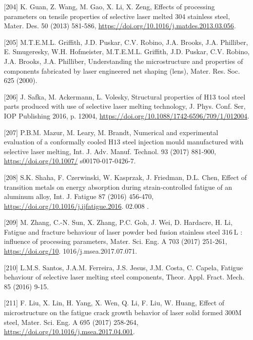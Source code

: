 \documentclass[10pt]{article}
\begin{document}
[204] K. Guan, Z. Wang, M. Gao, X. Li, X. Zeng, Effects of processing parameters on tensile properties of selective laser melted 304 stainless steel, Mater. Des. 50 (2013) 581-586, \href{https://doi.org/10.1016/j.matdes.2013.03.056}{https://doi.org/10.1016/j.matdes.2013.03.056}.

[205] M.T.E.M.L. Griffith, J.D. Puskar, C.V. Robino, J.A. Brooks, J.A. Philliber, E. Smugeresky, W.H. Hofmeister, M.T.E.M.L. Griffith, J.D. Puskar, C.V. Robino, J.A. Brooks, J.A. Philliber, Understanding the microstructure and properties of components fabricated by laser engineered net shaping (lens), Mater. Res. Soc. 625 (2000).

[206] J. Safka, M. Ackermann, L. Volesky, Structural properties of H13 tool steel parts produced with use of selective laser melting technology, J. Phys. Conf. Ser, IOP Publishing 2016, p. 12004, \href{https://doi.org/10.1088/1742-6596/709/1/012004}{https://doi.org/10.1088/1742-6596/709/1/012004}.

[207] P.B.M. Mazur, M. Leary, M. Brandt, Numerical and experimental evaluation of a conformally cooled $\mathrm{H} 13$ steel injection mould manufactured with selective laser melting, Int. J. Adv. Manuf. Technol. 93 (2017) 881-900, \href{https://doi.org/10.1007/}{https://doi.org/10.1007/} s00170-017-0426-7.

[208] S.K. Shaha, F. Czerwinski, W. Kasprzak, J. Friedman, D.L. Chen, Effect of transition metals on energy absorption during strain-controlled fatigue of an aluminum alloy, Int. J. Fatigue 87 (2016) 456-470, \href{https://doi.org/10.1016/j.ijfatigue.2016}{https://doi.org/10.1016/j.ijfatigue.2016}. 02.008 .

[209] M. Zhang, C.-N. Sun, X. Zhang, P.C. Goh, J. Wei, D. Hardacre, H. Li, Fatigue and fracture behaviour of laser powder bed fusion stainless steel $316 \mathrm{~L}$ : influence of processing parameters, Mater. Sci. Eng. A 703 (2017) 251-261, \href{https://doi.org/10}{https://doi.org/10}. 1016/j.msea.2017.07.071.

[210] L.M.S. Santos, J.A.M. Ferreira, J.S. Jesus, J.M. Costa, C. Capela, Fatigue behaviour of selective laser melting steel components, Theor. Appl. Fract. Mech. 85 (2016) 9-15.

[211] F. Liu, X. Lin, H. Yang, X. Wen, Q. Li, F. Liu, W. Huang, Effect of microstructure on the fatigue crack growth behavior of laser solid formed $300 \mathrm{M}$ steel, Mater. Sci. Eng. A 695 (2017) 258-264, \href{https://doi.org/10.1016/j.msea.2017.04.001}{https://doi.org/10.1016/j.msea.2017.04.001}.
\end{document}
